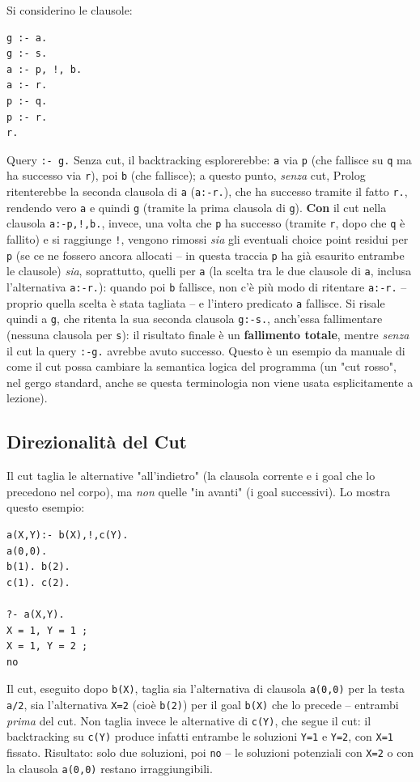 \documentclass[a4paper,11pt]{article}
\begin{document}
Si considerino le clausole:
\begin{lstlisting}
g :- a.
g :- s.
a :- p, !, b.
a :- r.
p :- q.
p :- r.
r.
\end{lstlisting}
Query \texttt{:- g.} Senza cut, il backtracking esplorerebbe: \texttt{a} via \texttt{p} (che fallisce su \texttt{q} ma ha successo via \texttt{r}), poi \texttt{b} (che fallisce); a questo punto, \emph{senza} cut, Prolog ritenterebbe la seconda clausola di \texttt{a} (\texttt{a:-r.}), che ha successo tramite il fatto \texttt{r.}, rendendo vero \texttt{a} e quindi \texttt{g} (tramite la prima clausola di \texttt{g}). \textbf{Con} il cut nella clausola \texttt{a:-p,!,b.}, invece, una volta che \texttt{p} ha successo (tramite \texttt{r}, dopo che \texttt{q} è fallito) e si raggiunge \texttt{!}, vengono rimossi \emph{sia} gli eventuali choice point residui per \texttt{p} (se ce ne fossero ancora allocati -- in questa traccia \texttt{p} ha già esaurito entrambe le clausole) \emph{sia}, soprattutto, quelli per \texttt{a} (la scelta tra le due clausole di \texttt{a}, inclusa l'alternativa \texttt{a:-r.}): quando poi \texttt{b} fallisce, non c'è più modo di ritentare \texttt{a:-r.} -- proprio quella scelta è stata tagliata -- e l'intero predicato \texttt{a} fallisce. Si risale quindi a \texttt{g}, che ritenta la sua seconda clausola \texttt{g:-s.}, anch'essa fallimentare (nessuna clausola per \texttt{s}): il risultato finale è un \textbf{fallimento totale}, mentre \emph{senza} il cut la query \texttt{:-g.} avrebbe avuto successo. Questo è un esempio da manuale di come il cut possa cambiare la semantica logica del programma (un "cut rosso", nel gergo standard, anche se questa terminologia non viene usata esplicitamente a lezione).

\subsection{Direzionalità del Cut}

Il cut taglia le alternative "all'indietro" (la clausola corrente e i goal che lo precedono nel corpo), ma \emph{non} quelle "in avanti" (i goal successivi). Lo mostra questo esempio:
\begin{lstlisting}
a(X,Y):- b(X),!,c(Y).
a(0,0).
b(1). b(2).
c(1). c(2).

?- a(X,Y).
X = 1, Y = 1 ;
X = 1, Y = 2 ;
no
\end{lstlisting}
Il cut, eseguito dopo \texttt{b(X)}, taglia sia l'alternativa di clausola \texttt{a(0,0)} per la testa \texttt{a/2}, sia l'alternativa \texttt{X=2} (cioè \texttt{b(2)}) per il goal \texttt{b(X)} che lo precede -- entrambi \emph{prima} del cut. Non taglia invece le alternative di \texttt{c(Y)}, che segue il cut: il backtracking su \texttt{c(Y)} produce infatti entrambe le soluzioni \texttt{Y=1} e \texttt{Y=2}, con \texttt{X=1} fissato. Risultato: solo due soluzioni, poi \texttt{no} -- le soluzioni potenziali con \texttt{X=2} o con la clausola \texttt{a(0,0)} restano irraggiungibili.
\end{document}
